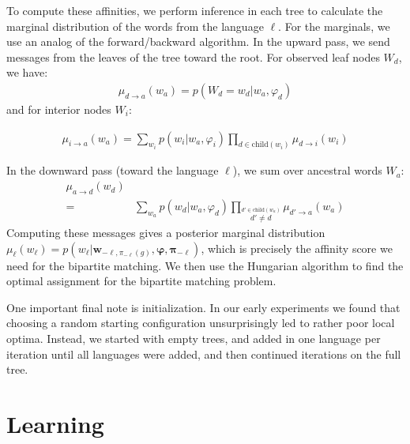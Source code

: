 \documentclass[11pt,a4paper]{article}
\begin{document}
To compute these affinities, we perform
inference in each tree to calculate the marginal distribution of
the words from the language $\ell$. For the marginals, we use an
analog of the forward/backward algorithm. In the upward pass, we
send messages from the leaves of the tree toward the root. For
observed leaf nodes $W_d$, we have:
\begin{equation*}
  \begin{split}
    \mu_{d\to a}(w_a) = p(W_d = w_d|w_a,\varphi_d)
   \end{split}
 \end{equation*}
 and for interior nodes $W_i$:\phantom{stupid Latex spacing\dots}
\resizebox{3in}{!} {
\begin{minipage}[b]{0.5\textwidth}
\begin{equation}
  \label{eqn:summing}
  \begin{split}
    \mu_{i\to a}(w_a) = \sum_{w_i} p(w_i|w_a,\varphi_i) \prod_{d \in \mathrm{child}(w_i)} \mu_{d \to i}(w_i) 
  \end{split}
\end{equation}
\end{minipage}
}
In the downward pass (toward the language $\ell$), we sum over ancestral words $W_a$:
\begin{equation*}
  \begin{split}
    \mu_{a\to d}(w_d)& \\
    = &\sum_{w_a} p(w_d|w_a,\varphi_d) \prod_{\stackrel{d' \in \mathrm{child}(w_a)}{d' \neq d}} \mu_{d' \to a}(w_a) 
  \end{split}
\end{equation*}
Computing these messages gives a posterior marginal distribution
$\mu_\ell(w_\ell) = p(w_\ell|\mathbf w_{-\ell,\pi_{-\ell}(g)},\mathbf \varphi,\mathbf\pi_{-\ell})$,
which is precisely the affinity score
we need for the bipartite matching. We then use the Hungarian
algorithm \cite{Kuhn1955} to find the optimal assignment for the
bipartite matching problem.

One important final note is initialization. In our early experiments
we found that choosing a random starting configuration unsurprisingly led
to rather poor local optima. Instead, we started with empty trees,
and added in one language per iteration until all languages were
added, and then continued iterations on the full tree.

\section{Learning}
\end{document}
